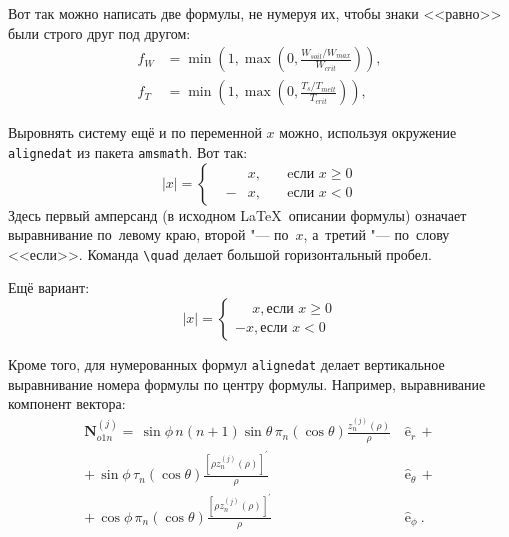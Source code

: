 Вот так можно написать две формулы, не нумеруя их, чтобы знаки <<равно>> были
строго друг под другом:
\begin{align}
  f_W & =  \min \left( 1, \max \left( 0, \frac{W_{soil} / W_{max}}{W_{crit}} \right)  \right), \nonumber \\
  f_T & =  \min \left( 1, \max \left( 0, \frac{T_s / T_{melt}}{T_{crit}} \right)  \right), \nonumber
\end{align}

Выровнять систему ещё и по переменной \( x \) можно, используя окружение
\verb|alignedat| из пакета \verb|amsmath|. Вот так:
\[
    |x| = \left\{
    \begin{alignedat}{2}
        &&x, \quad &\text{eсли } x\geqslant 0 \\
        &-&x, \quad & \text{eсли } x<0
    \end{alignedat}
    \right.
\]
Здесь первый амперсанд (в исходном \LaTeX\ описании формулы) означает
выравнивание по~левому краю, второй "--- по~\( x \), а~третий "--- по~слову
<<если>>. Команда \verb|\quad| делает большой горизонтальный пробел.



Ещё вариант:
\[
    |x|=
    \begin{cases}
    \phantom{-}x, \text{если } x \geqslant 0 \\
    -x, \text{если } x<0
    \end{cases}
\]

Кроме того, для  нумерованных формул \verb|alignedat| делает вертикальное
выравнивание номера формулы по центру формулы. Например, выравнивание
компонент вектора:
\begin{equation}
\label{eq:2p3}
\begin{alignedat}{2}
{\mathbf{N}}_{o1n}^{(j)} = \,{\sin} \phi\,n\!\left(n+1\right)
         {\sin}\theta\,
         \pi_n\!\left({\cos} \theta\right)
         \frac{
               z_n^{(j)}\!\left( \rho \right)
              }{\rho}\,
           &{\boldsymbol{\hat{\mathrm e}}}_{r}\,+   \\
+\,
{\sin} \phi\,
         \tau_n\!\left({\cos} \theta\right)
         \frac{
            \left[\rho z_n^{(j)}\!\left( \rho \right)\right]^{\prime}
              }{\rho}\,
            &{\boldsymbol{\hat{\mathrm e}}}_{\theta}\,+   \\
+\,
{\cos} \phi\,
         \pi_n\!\left({\cos} \theta\right)
         \frac{
            \left[\rho z_n^{(j)}\!\left( \rho \right)\right]^{\prime}
              }{\rho}\,
            &{\boldsymbol{\hat{\mathrm e}}}_{\phi}\:.
\end{alignedat}
\end{equation}

